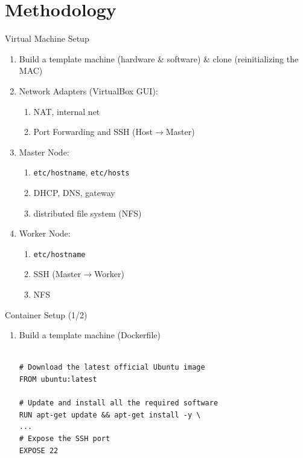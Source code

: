 \documentclass[10pt]{beamer}
\begin{document}
\section{Methodology}
\begin{frame}{Virtual Machine Setup}
  \begin{enumerate}
    \item Build a template machine (hardware \& software) \& clone (reinitializing the MAC)
    \item Network Adapters (VirtualBox GUI):
    \begin{enumerate}
      \item NAT, internal net
      \item Port Forwarding and SSH (Host$\rightarrow$Master) 
    \end{enumerate}
    \item Master Node: 
    \begin{enumerate}
      \item \texttt{etc/hostname}, \texttt{etc/hosts}
      \item DHCP, DNS, gateway
      \item distributed file system (NFS)
    \end{enumerate}
    \item Worker Node: 
    \begin{enumerate}
      \item \texttt{etc/hostname}
      \item SSH (Master$\rightarrow$Worker)
      \item NFS
    \end{enumerate}
  \end{enumerate}
  
\end{frame}


\begin{frame}[fragile]{Container Setup (1/2)}
\begin{enumerate}
\item Build a template machine (\alert{Dockerfile})
{\small\begin{verbatim}

# Download the latest official Ubuntu image
FROM ubuntu:latest

# Update and install all the required software
RUN apt-get update && apt-get install -y \ 
...
# Expose the SSH port
EXPOSE 22
\end{verbatim}}

\end{enumerate}
  
\end{frame}
\end{document}
